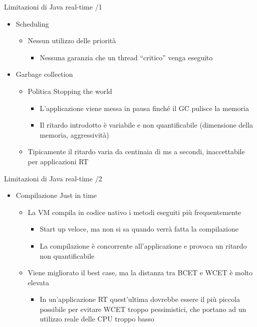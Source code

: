 \begin{frame}{Limitazioni di Java real-time /1}
	\begin{itemize}
		\item Scheduling
		\begin{itemize}
			\item Nessun utilizzo delle priorità
			\begin{itemize}
				\item Nessuna garanzia che un thread ``critico'' venga eseguito
			\end{itemize}
		\end{itemize}
		\item Garbage collection
		\begin{itemize}
			\item Politica Stopping the world
			\begin{itemize}
				\item L'applicazione viene messa in pausa finché il GC pulisce la memoria
				\item Il ritardo introdotto è variabile e non quantificabile (dimensione della memoria, aggressività)
			\end{itemize}
			\item Tipicamente il ritardo varia da centinaia di ms a secondi, inaccettabile per applicazioni RT
		\end{itemize}
	\end{itemize}
\end{frame}
\begin{frame}{Limitazioni di Java real-time /2}
	\begin{itemize}
		\item Compilazione Just in time
		\begin{itemize}
			\item La VM compila in codice nativo i metodi eseguiti più frequentemente
			\begin{itemize}
				\item Start up veloce, ma non si sa quando verrà fatta la compilazione
				\item La compilazione è concorrente all'applicazione e provoca un ritardo non quantificabile
			\end{itemize}
			\item Viene migliorato il best case, ma la distanza tra BCET e WCET è molto elevata
			\begin{itemize}
				\item In un'applicazione RT quest'ultima dovrebbe essere il più piccola possibile per evitare WCET troppo pessimistici, che portano ad un utilizzo reale delle CPU troppo basso
			\end{itemize}
		\end{itemize}
	\end{itemize}
\end{frame}